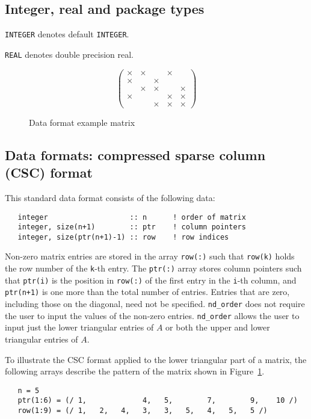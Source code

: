 \subsection{Integer, real and package types}

{\tt INTEGER} denotes default {\tt INTEGER}.

\noindent
{\tt REAL} denotes double precision real.


\begin{figure}
   \caption{ \label{nd:format_eg}
      Data format example matrix
   }
   $$
      \left( \begin{array}{ccccc}
         \times & \times &     & \times &     \\
         \times &     & \times &     &     \\
             & \times & \times &     & \times \\
         \times &     &     & \times & \times \\
             &     & \times & \times & \times
      \end{array} \right)
   $$
\end{figure}

\subsection{Data formats: compressed sparse column (CSC) format} \label{nd:cscformat}
This standard data format consists of the following data:
\begin{verbatim}
   integer                   :: n      ! order of matrix
   integer, size(n+1)        :: ptr    ! column pointers
   integer, size(ptr(n+1)-1) :: row    ! row indices
\end{verbatim}
Non-zero matrix entries are  stored in
the array \texttt{row(:)}  such that \texttt{row(k)} holds
the row number of the \texttt{k}-th entry.
The \texttt{ptr(:)} array stores column pointers such that \texttt{ptr(i)} is
the position in \texttt{row(:)}  of
the first entry in the \texttt{i}-th column, and \texttt{ptr(n+1)} is one more
than the total number of entries.
Entries that are zero, including those on the diagonal, need not be specified. 
\texttt{nd\_order} does not require the user to 
input the values of the non-zero entries.
\texttt{nd\_order} allows the user to input just the lower triangular 
entries of $A$  or both the upper and lower triangular entries of $A.$

To illustrate the CSC format applied to the lower triangular part of a matrix, 
the following arrays describe the pattern of the matrix shown in
Figure~\ref{nd:format_eg}.
\begin{verbatim}
   n = 5
   ptr(1:6) = (/ 1,             4,   5,        7,        9,    10 /)
   row(1:9) = (/ 1,   2,   4,   3,   3,   5,   4,   5,   5 /)
\end{verbatim}

